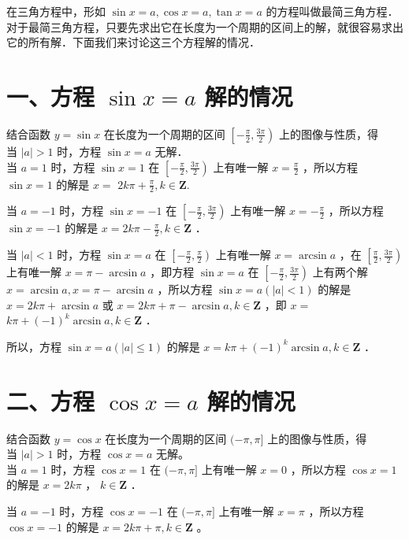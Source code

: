 \documentclass[10pt]{article}
\begin{document}
在三角方程中，形如 \(\sin x=a, \cos x=a, \tan x=a\) 的方程叫做最简三角方程．对于最简三角方程，只要先求出它在长度为一个周期的区间上的解，就很容易求出它的所有解．下面我们来讨论这三个方程解的情况．

\section*{一、方程 \(\sin x=a\) 解的情况}
结合函数 \(y=\sin x\) 在长度为一个周期的区间 \(\left[-\frac{\pi}{2}, \frac{3 \pi}{2}\right)\) 上的图像与性质，得\\
当 \(|a|>1\) 时，方程 \(\sin x=a\) 无解．\\
当 \(a=1\) 时，方程 \(\sin x=1\) 在 \(\left[-\frac{\pi}{2}, \frac{3 \pi}{2}\right)\) 上有唯一解 \(x=\frac{\pi}{2}\) ，所以方程 \(\sin x=1\) 的解是 \(x=\) \(2 k \pi+\frac{\pi}{2}, k \in \mathbf{Z}\).

当 \(a=-1\) 时，方程 \(\sin x=-1\) 在 \(\left[-\frac{\pi}{2}, \frac{3 \pi}{2}\right)\) 上有唯一解 \(x=-\frac{\pi}{2}\) ，所以方程 \(\sin x=-1\) 的解是 \(x=2 k \pi-\frac{\pi}{2}, k \in \mathbf{Z}\) ．

当 \(|a|<1\) 时，方程 \(\sin x=a\) 在 \(\left[-\frac{\pi}{2}, \frac{\pi}{2}\right)\) 上有唯一解 \(x=\arcsin a\) ，在 \(\left[\frac{\pi}{2}, \frac{3 \pi}{2}\right)\) 上有唯一解 \(x=\pi-\arcsin a\) ，即方程 \(\sin x=a\) 在 \(\left[-\frac{\pi}{2}, \frac{3 \pi}{2}\right)\) 上有两个解 \(x=\arcsin a, x=\pi-\arcsin a\) ，所以方程 \(\sin x=a(|a|<1)\) 的解是 \(x=2 k \pi+\arcsin a\) 或 \(x=2 k \pi+\pi-\arcsin a, k \in \mathbf{Z}\) ，即 \(x=\) \(k \pi+(-1)^{k} \arcsin a, k \in \mathbf{Z}\) ．

所以，方程 \(\sin x=a(|a| \leqslant 1)\) 的解是 \(x=k \pi+(-1)^{k} \arcsin a, k \in \mathbf{Z}\) ．

\section*{二、方程 \(\cos x=a\) 解的情况}
结合函数 \(y=\cos x\) 在长度为一个周期的区间 \((-\pi, \pi]\) 上的图像与性质，得\\
当 \(|a|>1\) 时，方程 \(\cos x=a\) 无解。\\
当 \(a=1\) 时，方程 \(\cos x=1\) 在 \((-\pi, \pi]\) 上有唯一解 \(x=0\) ，所以方程 \(\cos x=1\) 的解是 \(x=2 k \pi\) ， \(k \in \mathbf{Z}\) ．

当 \(a=-1\) 时，方程 \(\cos x=-1\) 在 \((-\pi, \pi]\) 上有唯一解 \(x=\pi\) ，所以方程 \(\cos x=-1\) 的解是 \(x=2 k \pi+\pi, k \in \mathbf{Z}\) 。
\end{document}

